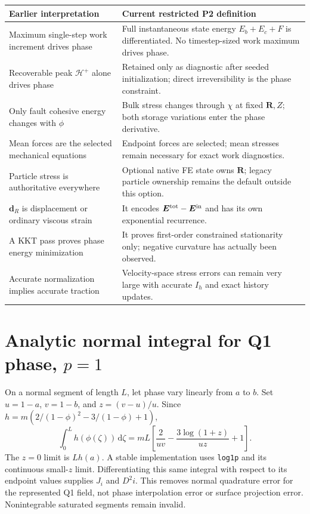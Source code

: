 \documentclass[11pt,a4paper]{article}
\newcommand{\R}{\bm R}
\newcommand{\Ein}{\bm E^{\rm in}}
\newcommand{\Etot}{\bm E^{\rm tot}}
\newcommand{\dd}{\,\mathrm d}
\begin{document}
\begin{longtable}{L{.29\textwidth}L{.61\textwidth}}
\toprule Earlier interpretation & Current restricted P2 definition\\\midrule\endhead
Maximum single-step work increment drives phase & Full instantaneous state
energy $E_b+E_c+F$ is differentiated. No timestep-sized work maximum drives phase.\\
Recoverable peak $\mathcal H^+$ alone drives phase & Retained only as diagnostic
after seeded initialization; direct irreversibility is the phase constraint.\\
Only fault cohesive energy changes with $\phi$ & Bulk stress changes through
$\chi$ at fixed $\R,Z$; both storage variations enter the phase derivative.\\
Mean forces are the selected mechanical equations & Endpoint forces are selected;
mean stresses remain necessary for exact work diagnostics.\\
Particle stress is authoritative everywhere & Optional native FE state owns
$\R$; legacy particle ownership remains the default outside this option.\\
$\bm d_R$ is displacement or ordinary viscous strain & It encodes
$\Etot-\Ein$ and has its own exponential recurrence.\\
A KKT pass proves phase energy minimization & It proves first-order constrained
stationarity only; negative curvature has actually been observed.\\
Accurate normalization implies accurate traction & Velocity-space stress errors
can remain very large with accurate $I_h$ and exact history updates.\\
\bottomrule
\end{longtable}

\appendix
\section{Analytic normal integral for Q1 phase, \texorpdfstring{$p=1$}{p=1}}

On a normal segment of length $L$, let phase vary linearly from $a$ to $b$.
Set $u=1-a$, $v=1-b$, and $z=(v-u)/u$. Since
$h=m(2/(1-\phi)^2-3/(1-\phi)+1)$,
\begin{equation}
 \int_0^L h(\phi(\zeta))\dd\zeta
 =mL\left[\frac2{uv}-\frac{3\log(1+z)}{uz}+1\right].
 \label{eq:analytic-I}
\end{equation}
The $z=0$ limit is $Lh(a)$. A stable implementation uses
\texttt{log1p} and its continuous small-$z$ limit. Differentiating this same
integral with respect to its endpoint values supplies $J_i$ and $D^2i$.
This removes normal quadrature error for the represented Q1 field, not phase
interpolation error or surface projection error. Nonintegrable saturated
segments remain invalid.
\end{document}
